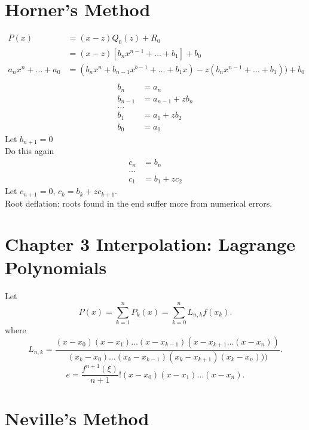 \documentclass[class=article, crop=false]{standalone}
\theoremstyle{plain}
\theoremstyle{remark}
\begin{document}
\section{Horner's Method} 
\begin{equation*}
\begin{split}
	P(x)&=(x-z)Q_0(z)+R_0 \\
	    &=(x-z) [b_nx^{n-1}+ \ldots +b_1] +b_0\\
	   a_n x^n + \ldots + a_0  &=(b_n x^n + b_{n-1}x^{b-1}+ \ldots +b_1 x )- z(b_n x^{n-1} + \ldots+b_1 )) +b_0 \\
\end{split}
\end{equation*}
\begin{equation*}
\begin{split}
	b_n&=a_n\\
	b_{n-1}&=a_{n-1}+zb_n\\
	\ldots\\
	b_1&=a_1+z b_2\\
	b_0 &=a_0
\end{split}
\end{equation*}
Let $b_{n+1}=0$\\
Do this again
\begin{equation*}
\begin{split}
	c_n&=b_n\\
	\ldots\\
	c_1&=b_1+z c_2
\end{split}
\end{equation*}
Let $c_{n+1}=0$, $c_k=b_k+z c_{k+1} $.\\

Root deflation: roots found in the end suffer more from numerical errors.\\

\section{Chapter 3 Interpolation: Lagrange Polynomials}

Let 
\[
	P(x) = \sum_{k=1}^n  P_k(x) = \sum_{k=0}^n L_{n,k} f(x_k)     
.\] 
where
\[
L_{n,k} =  \frac{ (x-x_0)(x-x_1)\ldots(x-x_{k-1})(x-x_{k+1}\ldots (x-x_{n}))}{(x_k -x_0)\ldots (x_k-x_{k-1})(x_k-x_{k+1}) (x_k-x_{n})))} 
.\] 
\[
	e=\frac{f^{n+1}(\xi)}{n+1}! (x-x_0)(x-x_1)\ldots(x-x_n)      
.\] 

\section{Neville's Method}
\end{document}
